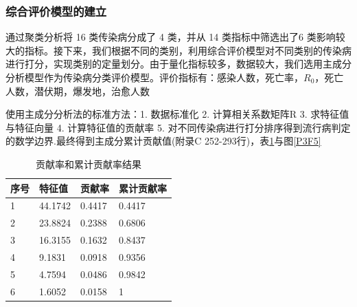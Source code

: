 \documentclass[a4paper, 11pt,twoside=true,UTF8]{scrartcl}
\begin{document}
\subsubsection{综合评价模型的建立}
\qquad 通过聚类分析将 16 类传染病分成了 4 类，并从 14 类指标中筛选出了6 类影响较大的指标。接下来，我们根据不同的类别，利用综合评价模型对不同类别的传染病进行打分，实现类别的定量划分。由于量化指标较多，数据较大，我们选用主成分分析模型作为传染病分类评价模型。评价指标有：感染人数，死亡率，$R_0$，死亡人数，潜伏期，爆发地，治愈人数

使用主成分分析法的标准方法：1. 数据标准化 2. 计算相关系数矩阵R 3. 求特征值与特征向量 4. 计算特征值的贡献率 5. 对不同传染病进行打分排序得到流行病判定的数学边界.最终得到主成分累计贡献值(附录C 252-293行)，表\ref{P3T5}与图\ref{P3F5}

\begin{table}[H]
	\centering
	\caption{贡献率和累计贡献率结果} \label{P3T5}
	\begin{tabular}{llll}
		\hline
		\textbf{序号} & \textbf{特征值} & \textbf{贡献率} & \textbf{累计贡献率} \\ \hline
		1           & 44.1742      & 0.4417       & 0.4417         \\
		2           & 23.8824      & 0.2388       & 0.6806         \\
		3           & 16.3155      & 0.1632       & 0.8437         \\
		4           & 9.1831       & 0.0918       & 0.9356         \\
		5           & 4.7594       & 0.0486       & 0.9842         \\
		6           & 1.6052       & 0.0158       & 1              \\ \hline
	\end{tabular}
\end{table}
\end{document}

